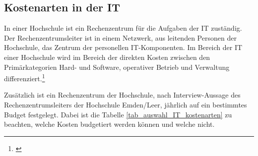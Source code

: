 \subsection{Kostenarten in der IT}
In einer Hochschule ist ein Rechenzentrum für die Aufgaben der IT zuständig.
Der Rechenzentrumsleiter ist in einem Netzwerk, aus leitenden Personen der Hochschule, das Zentrum der personellen IT-Komponenten. Im Bereich der IT einer Hochschule wird im Bereich der direkten Kosten zwischen den Primärkategorien Hard- und Software, operativer Betrieb und Verwaltung differenziert.\footnote{\cite{hansen_business_2009}}

Zusätzlich ist ein Rechenzentrum der Hochschule, nach Interview-Aussage des Rechenzentrumsleiters der Hochschule Emden/Leer, jährlich auf ein bestimmtes Budget festgelegt. Dabei ist die Tabelle \ref{tab_auswahl_IT_kostenarten} zu beachten, welche Kosten budgetiert werden können und welche nicht.

